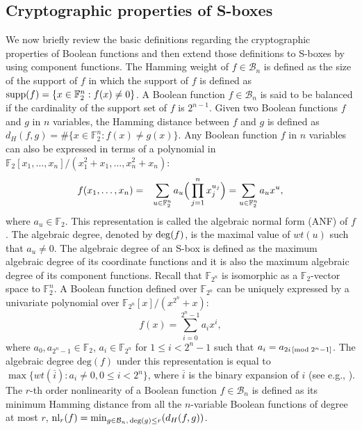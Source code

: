 \documentclass[12 pt]{article}
\def\F{{\mathbb F}}
\begin{document}
\subsection{Cryptographic properties of S-boxes}
We now briefly review the basic definitions regarding the cryptographic properties of Boolean functions and then extend those definitions to S-boxes by using component functions. The Hamming
weight of $f\in\mathcal B_n$ is defined as the size of the support of $f$ in which the support of $f$ is defined as ${\rm supp}(f)=\{x\in\F_2^n : f(x)\not=0\}$.  A Boolean function $f\in\mathcal{B}_n$ is said to be balanced if the cardinality of the support set of $f$  is $2^{n-1}$.
Given two Boolean functions $f$ and $g$ in $n$ variables, the Hamming distance between $f$ and $g$ is defined as $d_H(f,g)=\#\{x\in\F_2^n  : f(x)\ne g(x) \}$. Any Boolean function $f$
in $n$ variables can also be expressed in terms of a polynomial in $\F_2[x_1,\ldots,x_n]/(x_1^2+x_1,\ldots,x_n^2+ x_n)$:
\begin{eqnarray*}\label{D:ANF}
f(x_1,\ldots,x_n)&=&\sum_{u\in\F_2^n}a_u\Big{(}\prod_{j=1}^n x_j^{u_j}\Big{)}=\sum_{u\in\F_2^n}a_u x^u,
\end{eqnarray*}
where $a_u\in\F_2$. This representation is called the algebraic normal form (ANF) of $f$. The algebraic degree, denoted by ${\rm deg}(f)$, is the maximal value of $wt(u)$ such that
$a_u \ne 0$. The algebraic degree of an S-box is defined as the maximum algebraic degree of its coordinate functions and it is also the maximum algebraic degree of its component functions.
Recall that $\F_{2^n}$ is isomorphic as a $\F_2$-vector space to $\F_2^n$.  A Boolean function defined over $\F_{2^n}$ can be uniquely expressed by a univariate
polynomial over $\F_{2^n}[x]/(x^{2^n}+x)$:
\begin{equation*}\label{Ploynoimal}
f(x) =\sum_{i=0}^{2^n-1} a_i x^i,
\end{equation*}
where $a_0,a_{2^n-1}\in\F_2$, $a_{i}\in\F_{2^n}$ for $1\le i<2^n-1$ such that $a_i=a_{2i\, [{\rm mod}\; 2^n-1]}$. The algebraic degree $\textrm{deg}(f)$ under this representation is equal to
$\max\{wt(\overline{i}) : a_i\ne 0, 0\le i<2^n\}$, where $\overline{i}$ is the binary expansion of $i$ (see e.g., \cite{Carlet10}). The $r$-th order nonlinearity of a Boolean function
$f\in\mathcal{B}_n$ is defined as its minimum Hamming distance from all the $n$-variable Boolean functions of degree at most $r$,
$\mathrm{nl}_r(f)=\min_{g\in\mathcal{B}_n,\,{\rm deg}(g)\le r}(d_H(f,g))$.
\end{document}

